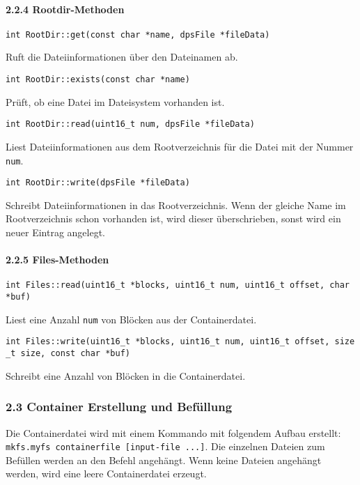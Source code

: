 \documentclass[]{article}
\let\oldparagraph\paragraph
\renewcommand{\paragraph}[1]{\oldparagraph{#1}\mbox{}}
\begin{document}
\hypertarget{rootdir-methoden}{%
\paragraph{2.2.4 Rootdir-Methoden}\label{rootdir-methoden}}

\texttt{int\ RootDir::get(const\ char\ *name,\ dpsFile\ *fileData)}

Ruft die Dateiinformationen über den Dateinamen ab.

\texttt{int\ RootDir::exists(const\ char\ *name)}

Prüft, ob eine Datei im Dateisystem vorhanden ist.

\texttt{int\ RootDir::read(uint16\_t\ num,\ dpsFile\ *fileData)}

Liest Dateiinformationen aus dem Rootverzeichnis für die Datei mit der
Nummer \texttt{num}.

\texttt{int\ RootDir::write(dpsFile\ *fileData)}

Schreibt Dateiinformationen in das Rootverzeichnis. Wenn der gleiche
Name im Rootverzeichnis schon vorhanden ist, wird dieser überschrieben,
sonst wird ein neuer Eintrag angelegt.

\hypertarget{files-methoden}{%
\paragraph{2.2.5 Files-Methoden}\label{files-methoden}}

\texttt{int\ Files::read(uint16\_t\ *blocks,\ uint16\_t\ num,\ uint16\_t\ offset,\ char\ *buf)}

Liest eine Anzahl \texttt{num} von Blöcken aus der Containerdatei.

\texttt{int\ Files::write(uint16\_t\ *blocks,\ uint16\_t\ num,\ uint16\_t\ offset,\ size\_t\ size,\ const\ char\ *buf)}

Schreibt eine Anzahl von Blöcken in die Containerdatei.

\hypertarget{container-erstellung-und-befuxfcllung}{%
\subsubsection{2.3 Container Erstellung und
Befüllung}\label{container-erstellung-und-befuxfcllung}}

Die Containerdatei wird mit einem Kommando mit folgendem Aufbau erstellt: \texttt{mkfs.myfs\ containerfile\ {[}input-file\ ...{]}}. Die
einzelnen Dateien zum Befüllen werden an den Befehl angehängt. Wenn
keine Dateien angehängt werden, wird eine leere Containerdatei erzeugt.
\end{document}
